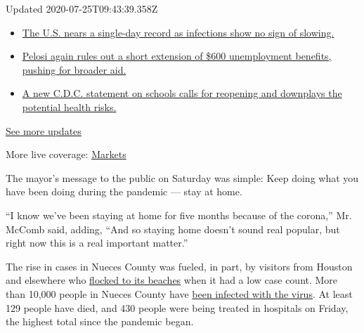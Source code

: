 Updated 2020-07-25T09:43:39.358Z

\begin{itemize}
\tightlist
\item
  \href{https://www.nytimes3xbfgragh.onion/2020/07/24/world/coronavirus-covid-19.html?action=click\&pgtype=Article\&state=default\&module=styln-coronavirus-national\&region=MAIN_CONTENT_1\&context=storylines_live_updates\#link-4331c0b7}{The
  U.S. nears a single-day record as infections show no sign of slowing.}
\item
  \href{https://www.nytimes3xbfgragh.onion/2020/07/24/world/coronavirus-covid-19.html?action=click\&pgtype=Article\&state=default\&module=styln-coronavirus-national\&region=MAIN_CONTENT_1\&context=storylines_live_updates\#link-625c8263}{Pelosi
  again rules out a short extension of \$600 unemployment benefits,
  pushing for broader aid.}
\item
  \href{https://www.nytimes3xbfgragh.onion/2020/07/24/world/coronavirus-covid-19.html?action=click\&pgtype=Article\&state=default\&module=styln-coronavirus-national\&region=MAIN_CONTENT_1\&context=storylines_live_updates\#link-6ec043c9}{A
  new C.D.C. statement on schools calls for reopening and downplays the
  potential health risks.}
\end{itemize}

\href{https://www.nytimes3xbfgragh.onion/2020/07/24/world/coronavirus-covid-19.html?action=click\&pgtype=Article\&state=default\&module=styln-coronavirus-national\&region=MAIN_CONTENT_1\&context=storylines_live_updates}{See
more updates}

More live coverage:
\href{https://www.nytimes3xbfgragh.onion/live/2020/07/24/business/stock-market-updates-coronavirus?action=click\&pgtype=Article\&state=default\&module=styln-coronavirus-national\&region=MAIN_CONTENT_1\&context=storylines_live_updates}{Markets}

The mayor's message to the public on Saturday was simple: Keep doing
what you have been doing during the pandemic --- stay at home.

``I know we've been staying at home for five months because of the
corona,'' Mr. McComb said, adding, ``And so staying home doesn't sound
real popular, but right now this is a real important matter.''

The rise in cases in Nueces County was fueled, in part, by visitors from
Houston and elsewhere who
\href{https://www.nytimes3xbfgragh.onion/2020/07/11/us/coronavirus-texas-corpus-christi.html}{flocked
to its beaches} when it had a low case count. More than 10,000 people in
Nueces County have
\href{https://www.nytimes3xbfgragh.onion/interactive/2020/us/texas-coronavirus-cases.html}{been
infected with the virus}. At least 129 people have died, and 430 people
were being treated in hospitals on Friday, the highest total since the
pandemic began.

